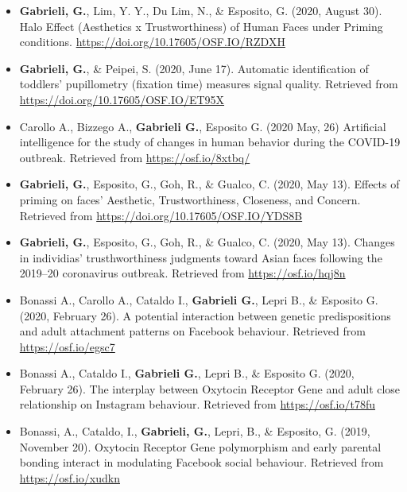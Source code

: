 \documentclass[10pt,a4paper]{altacv}
\begin{document}
\begin{fullwidth}
\begin{itemize}
            \item \textbf{Gabrieli, G.}, Lim, Y. Y., Du Lim, N., \& Esposito, G. (2020, August 30). Halo Effect  (Aesthetics x Trustworthiness) of Human Faces under Priming conditions. \href{https://doi.org/10.17605/OSF.IO/RZDXH}{https://doi.org/10.17605/OSF.IO/RZDXH}
            
            \item \textbf{Gabrieli, G.}, \& Peipei, S. (2020, June 17). Automatic identification of toddlers’ pupillometry (fixation time) measures signal quality. Retrieved from \href{https://doi.org/10.17605/OSF.IO/ET95X}{https://doi.org/10.17605/OSF.IO/ET95X}
            
            \item Carollo A., Bizzego A., \textbf{Gabrieli G.}, Esposito G. (2020 May, 26) Artificial intelligence for the study of changes in human behavior during the COVID-19 outbreak. Retrieved from \href{https://osf.io/8xtbq/}{https://osf.io/8xtbq/}
            
            \item \textbf{Gabrieli, G.}, Esposito, G., Goh, R., \& Gualco, C. (2020, May 13). Effects of priming on faces' Aesthetic, Trustworthiness, Closeness, and Concern. Retrieved from \href{https://doi.org/10.17605/OSF.IO/YDS8B}{https://doi.org/10.17605/OSF.IO/YDS8B}
            
            \item \textbf{Gabrieli, G.}, Esposito, G., Goh, R., \& Gualco, C. (2020, May 13). Changes in individias' trusthworthiness judgments toward Asian faces following the 2019–20 coronavirus outbreak. Retrieved from \href{https://osf.io/hqj8n}{https://osf.io/hqj8n}
            
            \item Bonassi A., Carollo A., Cataldo I., \textbf{Gabrieli G.}, Lepri B., \& Esposito G. (2020, February 26). A potential interaction between genetic predispositions and adult attachment patterns on Facebook behaviour. Retrieved from \href{https://osf.io/egsc7}{https://osf.io/egsc7}
            
            \item Bonassi A., Cataldo I., \textbf{Gabrieli G.}, Lepri B., \& Esposito G. (2020, February 26). The interplay between Oxytocin Receptor Gene and adult close relationship on Instagram behaviour. Retrieved from \href{https://osf.io/t78fu}{https://osf.io/t78fu}
            
            \item Bonassi, A., Cataldo, I., \textbf{Gabrieli, G.}, Lepri, B., \& Esposito, G. (2019, November 20). Oxytocin Receptor Gene polymorphism and early parental bonding interact in modulating Facebook social behaviour. Retrieved from \href{https://osf.io/xudkn}{https://osf.io/xudkn}
            

\end{itemize}
\end{fullwidth}
\end{document}
